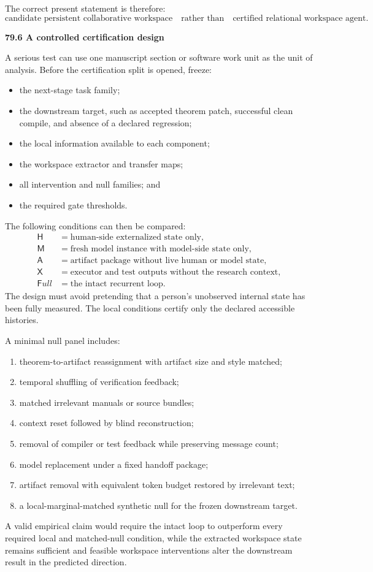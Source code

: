 \documentclass[11pt,letterpaper]{article}
\newcommand{\subtopic}[1]{%
 \vspace{0.45em}
 {\bfseries\color{AccentColor} #1\par}
}
\theoremstyle{plain}
\theoremstyle{definition}
\begin{document}
The correct present statement is therefore:
\[
\boxed{
\text{candidate persistent collaborative workspace}
\quad\text{rather than}\quad
\text{certified relational workspace agent}.
}
\]

\subtopic{79.6 A controlled certification design}

A serious test can use one manuscript section or software work unit as the unit of analysis.
Before the certification split is opened, freeze:
\begin{itemize}
\item the next-stage task family;
\item the downstream target, such as accepted theorem patch, successful clean
 compile, and absence of a declared regression;
\item the local information available to each component;
\item the workspace extractor and transfer maps;
\item all intervention and null families; and
\item the required gate thresholds.
\end{itemize}
The following conditions can then be compared:
\[
\begin{array}{ll}
\mathsf H & =\text{human-side externalized state only},\\
\mathsf M & =\text{fresh model instance with model-side state only},\\
\mathsf A & =\text{artifact package without live human or model state},\\
\mathsf X & =\text{executor and test outputs without the research context},\\
\mathsf Full & =\text{the intact recurrent loop}.
\end{array}
\]
The design must avoid pretending that a person's unobserved internal state has
been fully measured. The local conditions certify only the declared accessible
histories.

A minimal null panel includes:
\begin{enumerate}
\item theorem-to-artifact reassignment with artifact size and style matched;
\item temporal shuffling of verification feedback;
\item matched irrelevant manuals or source bundles;
\item context reset followed by blind reconstruction;
\item removal of compiler or test feedback while preserving message count;
\item model replacement under a fixed handoff package;
\item artifact removal with equivalent token budget restored by irrelevant text;
\item a local-marginal-matched synthetic null for the frozen downstream target.
\end{enumerate}
A valid empirical claim would require the intact loop to outperform every
required local and matched-null condition, while the extracted workspace state
remains sufficient and feasible workspace interventions alter the downstream
result in the predicted direction.
\end{document}
